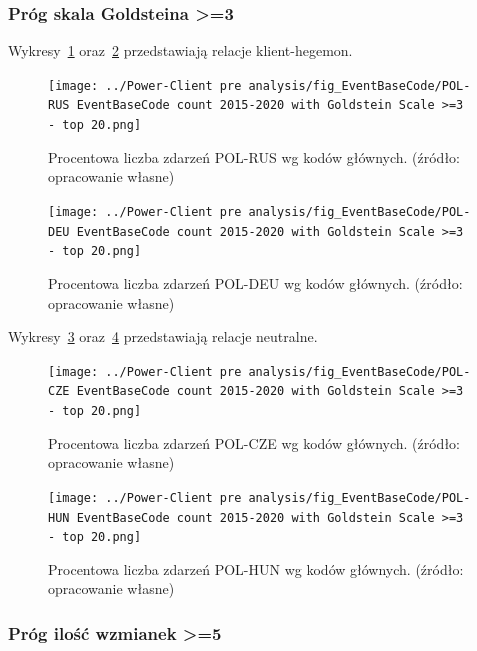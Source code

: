 \documentclass[11pt]{report}
\begin{document}
    \subsubsection{Próg skala Goldsteina >=3}\label{subsubsec:ebc:próg-skala-goldsteina->=3}
    Wykresy~\ref{fig:Power-Client:EBC:Goldstein:POL-RUS} oraz~\ref{fig:Power-Client:EBC:Goldstein:POL-DEU} przedstawiają relacje klient-hegemon.

    \begin{figure}[!htp]
        \centering
        \texttt{[image: ../Power-Client pre analysis/fig\_EventBaseCode/POL-RUS EventBaseCode count 2015-2020 with Goldstein Scale >=3 - top 20.png]}
        \caption{Procentowa liczba zdarzeń POL-RUS wg kodów głównych. (źródło: opracowanie własne)}
        \label{fig:Power-Client:EBC:Goldstein:POL-RUS}
    \end{figure}

    \begin{figure}[!htp]
        \centering
        \texttt{[image: ../Power-Client pre analysis/fig\_EventBaseCode/POL-DEU EventBaseCode count 2015-2020 with Goldstein Scale >=3 - top 20.png]}
        \caption{Procentowa liczba zdarzeń POL-DEU wg kodów głównych. (źródło: opracowanie własne)}
        \label{fig:Power-Client:EBC:Goldstein:POL-DEU}
    \end{figure}

    Wykresy~\ref{fig:Power-Client:EBC:Goldstein:POL-CZE} oraz~\ref{fig:Power-Client:EBC:Goldstein:POL-HUN} przedstawiają relacje neutralne.

    \begin{figure}[!htp]
        \centering
        \texttt{[image: ../Power-Client pre analysis/fig\_EventBaseCode/POL-CZE EventBaseCode count 2015-2020 with Goldstein Scale >=3 - top 20.png]}
        \caption{Procentowa liczba zdarzeń POL-CZE wg kodów głównych. (źródło: opracowanie własne)}
        \label{fig:Power-Client:EBC:Goldstein:POL-CZE}
    \end{figure}

    \begin{figure}[!htp]
        \centering
        \texttt{[image: ../Power-Client pre analysis/fig\_EventBaseCode/POL-HUN EventBaseCode count 2015-2020 with Goldstein Scale >=3 - top 20.png]}
        \caption{Procentowa liczba zdarzeń POL-HUN wg kodów głównych. (źródło: opracowanie własne)}
        \label{fig:Power-Client:EBC:Goldstein:POL-HUN}
    \end{figure}

    \subsubsection{Próg ilość wzmianek >=5}\label{subsubsec:ebc:próg-ilość-wzmianek->=5}
\end{document}
